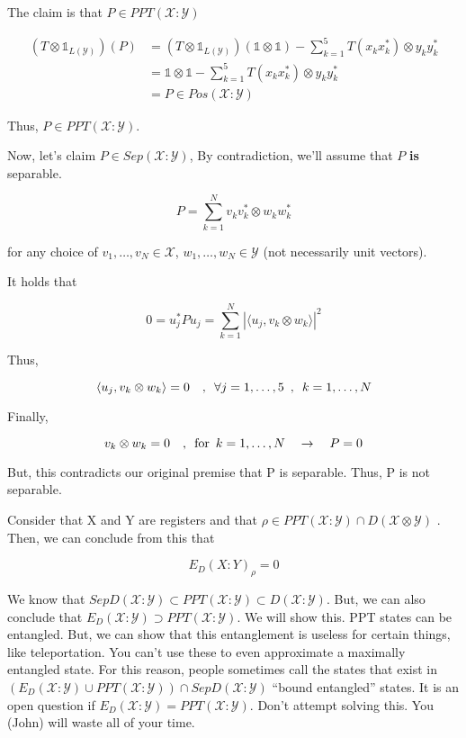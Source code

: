 \documentclass{article}
\begin{document}
The claim is that $P \in PPT(\mathcal{X}:\mathcal{Y})$

\begin{align*}
    \left( T \otimes \mathds{1}_{L(\mathcal{Y})} \right) \left( P \right)
    &= \left( T \otimes \mathds{1}_{L(\mathcal{Y})} \right) \left( \mathds{1}
\otimes \mathds{1} \right) - \sum_{k=1}^5 T(x_k x_k^*) \otimes y_k y_k^* \\
&= \mathds{1} \otimes \mathds{1} - \sum_{k=1}^5 T(x_k x_k^*) \otimes y_k y_k^*
\\
&= P \in Pos(\mathcal{X}:\mathcal{Y})
\end{align*}

Thus, $P \in PPT(\mathcal{X}:\mathcal{Y})$.

Now, let's claim $ P \in Sep(\mathcal{X}:\mathcal{Y})$, By contradiction, we'll
assume that $P$ \textbf{is} separable.

\[ 
    P = \sum_{k=1}^N v_k v_k^* \otimes w_k w_k^* 
\]

for any choice of $v_1,\ldots,v_N \in \mathcal{X}$, $w_1,\ldots,w_N \in
\mathcal{Y}$ (not necessarily unit vectors).

It holds that

\[ 
    0 = u_j^* P u_j = \sum_{k=1}^N \left| \langle u_j , v_k \otimes w_k \rangle
    \right|^2 
\]

Thus,

\[ 
    \langle u_j , v_k \otimes w_k \rangle  = 0 \quad,\enskip \forall
    j=1,\ldots,5 \enskip,\enskip k=1,\ldots,N 
\]

Finally,

\[ 
v_k \otimes w_k = 0 \quad,\enskip \text{for}\enskip k=1,\ldots,N \quad
\rightarrow \quad P = 0 
\]

But, this contradicts our original premise that P is separable. Thus, P is not
separable.

Consider that X and Y are registers and that $\rho \in
PPT(\mathcal{X}:\mathcal{Y}) \cap D(\mathcal{X}\otimes \mathcal{Y})$ . Then, we
can conclude from this that

\[ 
    E_D(X:Y)_\rho = 0 
\]


We know that $SepD(\mathcal{X}:\mathcal{Y}) \subset PPT(\mathcal{X}:\mathcal{Y})
\subset D(\mathcal{X}:\mathcal{Y})$. But, we can also conclude that $E_D
(\mathcal{X}:\mathcal{Y}) \supset PPT(\mathcal{X}:\mathcal{Y})$. We will show
this. PPT states can be entangled. But, we can show that this entanglement is
useless for certain things, like teleportation. You can't use these to even
approximate a maximally entangled state. For this reason, people sometimes call
the states that exist in $\left( E_D (\mathcal{X}:\mathcal{Y}) \cup
PPT(\mathcal{X}:\mathcal{Y}) \right) \cap SepD(\mathcal{X}:\mathcal{Y})$ ``bound
entangled'' states. It is an open question if $E_D(\mathcal{X}:\mathcal{Y}) =
PPT(\mathcal{X}:\mathcal{Y})$. Don't attempt solving this. You (John) will waste
all of your time.
\end{document}

